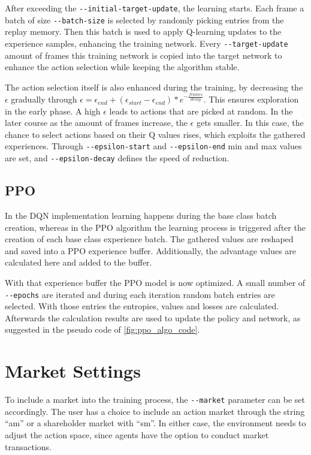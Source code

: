 After exceeding the \verb|--initial-target-update|, the learning starts. Each frame a batch of size \verb|--batch-size| is selected by randomly picking entries from the replay memory. Then this batch is used to apply Q-learning updates to the experience samples, enhancing the training network. Every \verb|--target-update| amount of frames this training network is copied into the target network to enhance the action selection while keeping the algorithm stable.

The action selection itself is also enhanced during the training, by decreasing the $\epsilon$ gradually through $\epsilon = \epsilon_{end}+(\epsilon_{start}-\epsilon_{end})*e^{-\frac{frames}{decay}}$. This ensures exploration in the early phase. A high $\epsilon$ leads to actions that are picked at random. In the later course as the amount of frames increase, the $\epsilon$ gets smaller. In this case, the chance to select actions based on their Q values rises, which exploits the gathered experiences. Through \verb|--epsilon-start| and \verb|--epsilon-end| min and max values are set, and \verb|--epsilon-decay| defines the speed of reduction.

\subsection{PPO}
In the DQN implementation learning happens during the base class batch creation, whereas in the PPO algorithm the learning process is triggered after the creation of each base class experience batch. The gathered values are reshaped and saved into a PPO experience buffer. Additionally, the advantage values are calculated here and added to the buffer.

With that experience buffer the PPO model is now optimized. A small number of \verb|--epochs| are iterated and during each iteration random batch entries are selected. With those entries the entropies, values and losses are calculated. Afterwards the calculation results are used to update the policy and network, as suggested in the pseudo code of \ref{fig:ppo_algo_code}.

\section{Market Settings}\label{market_settings}
To include a market into the training process, the \verb|--market| parameter can be set accordingly. The user has a choice to include an action market through the string ``am'' or a shareholder market with ``sm''. In either case, the environment needs to adjust the action space, since agents have the option to conduct market transactions.

